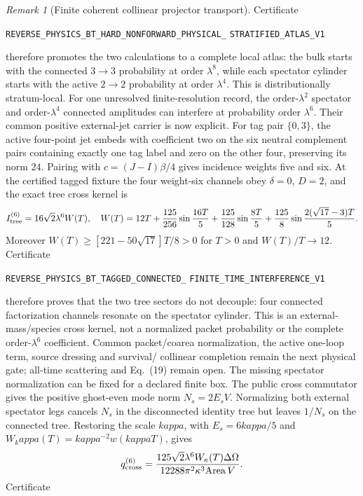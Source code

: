 \documentclass[11pt]{article}
\theoremstyle{definition}
\theoremstyle{remark}
\newtheorem{remark}[theorem]{Remark}
\begin{document}
\begin{remark}[Finite coherent collinear projector transport]
Certificate
\par\noindent
\texttt{REVERSE\_PHYSICS\_BT\_HARD\_NONFORWARD\_PHYSICAL\_}
\allowbreak\texttt{STRATIFIED\_ATLAS\_V1}
\par\noindent
therefore promotes the two calculations to a complete local atlas: the bulk
starts with the connected $3\to3$ probability at order $\lambda^8$, while
each spectator cylinder starts with the active $2\to2$ probability at order
$\lambda^4$.  This is distributionally stratum-local.  For one unresolved
finite-resolution record, the order-$\lambda^2$ spectator and
order-$\lambda^4$ connected amplitudes can interfere at probability order
$\lambda^6$.  Their common positive external-jet carrier is now explicit.
For tag pair $\{0,3\}$, the active four-point jet embeds with coefficient two
on the six neutral complement pairs containing exactly one tag label and zero
on the other four, preserving its norm $24$.  Pairing with
$c=(J-I)\beta/4$ gives incidence weights five and six.  At the certified
tagged fixture the four weight-six channels obey $\delta=0$, $D=2$, and the
exact tree cross kernel is
\[
 I_{\rm tree}^{(6)}=16\sqrt2\lambda^6W(T),
\quad
 W(T)=12T+\frac{125}{256}\sin\frac{16T}{5}
 +\frac{125}{128}\sin\frac{8T}{5}
 +\frac{125}{8}\sin\frac{2(\sqrt{17}-3)T}{5}.
\]
Moreover
$W(T)\geq[221-50\sqrt{17}]T/8>0$ for $T>0$ and
$W(T)/T\to12$.  Certificate
\par\noindent
\texttt{REVERSE\_PHYSICS\_BT\_TAGGED\_CONNECTED\_}
\allowbreak\texttt{FINITE\_TIME\_INTERFERENCE\_V1}
\par\noindent
therefore proves that the two tree sectors do not decouple: four connected
factorization channels resonate on the spectator cylinder.  This is an
external-mass/species cross kernel, not a normalized packet probability or
the complete order-$\lambda^6$ coefficient.  Common packet/coarea
normalization, the active one-loop term, source dressing and survival/
collinear completion remain the next physical gate; all-time scattering and
Eq.~(19) remain open.
The missing spectator normalization can be fixed for a declared finite box.
The public cross commutator gives the positive ghost-even mode norm
$N_s=2E_sV$.  Normalizing both external spectator legs cancels $N_s$ in the
disconnected identity tree but leaves $1/N_s$ on the connected tree.  Restoring
the scale $kappa$, with $E_s=6kappa/5$ and
$W_kappa(T)=kappa^{-2}w(kappa T)$, gives
\[
 q_{\rm cross}^{(6)}=
 \frac{125\sqrt2\lambda^6W_\kappa(T)\Delta\Omega}
 {12288\pi^2\kappa^3\mathrm{Area}\,V}.
\]
Certificate
\par\noindent

\end{remark}
\end{document}
